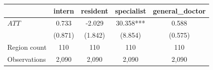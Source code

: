 
\begin{tabular}{lcccc}
\toprule
 & intern & resident & specialist & general\_doctor\\
\midrule
$ATT$ & 0.733 & -2.029 & 30.358*** & 0.588\\
 & (0.871) & (1.842) & (8.854) & (0.575)\\
\midrule
Region count & 110 & 110 & 110 & 110\\
Observations & 2,090 & 2,090 & 2,090 & 2,090\\
\bottomrule
\end{tabular}
